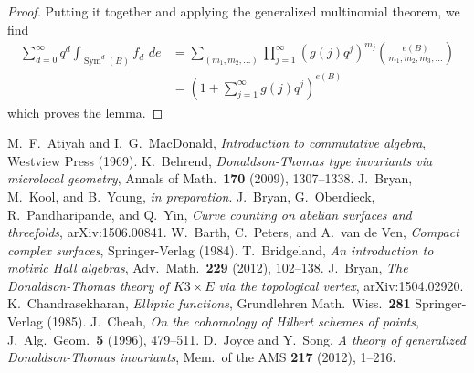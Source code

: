 \documentclass{amsart}
\theoremstyle{definition}
\newcommand{\Sym}{\operatorname{Sym}}
\begin{document}
\begin{proof}
Putting it together and applying the generalized multinomial theorem,
we find
\begin{align*}
\sum _{d=0}^{\infty } q^d \int _{\Sym ^{d} (B)}f_{d}\,\,de & = \sum _{(m_{1},m_{2},\dots )} \prod _{j=1}^{\infty } \left(g (j) q^{j} \right)^{m_{j}} \binom{e (B)}{m_{1},m_{2},m_{3},\dots }\\
&=\left(1+\sum _{j=1}^{\infty }g (j) q^{j} \right)^{e (B)}
\end{align*}
which proves the lemma.   
\end{proof}

     
\begin{thebibliography}{MNOP2}
 M.~F.~Atiyah and I.~G.~MacDonald, \textit{Introduction to commutative algebra}, Westview Press (1969).
 K.~Behrend, \textit{Donaldson-Thomas type invariants via microlocal geometry}, Annals of Math.~\textbf{170} (2009), 1307--1338.
 J.~Bryan, M.~Kool, and B.~Young, \emph{in preparation}.
 J.~Bryan, G.~Oberdieck, R.~Pandharipande, and Q.~Yin, \emph{Curve counting on abelian surfaces and threefolds}, arXiv:1506.00841.
 W.~Barth, C.~Peters, and A.~van de Ven, \textit{Compact complex surfaces}, Springer-Verlag (1984).
 T.~Bridgeland, \textit{An introduction to motivic Hall algebras}, Adv.~Math.~\textbf{229} (2012), 102--138.
 J.~Bryan, \textit{The Donaldson-Thomas theory of $K3 \times E$ via the topological vertex}, arXiv:1504.02920.
 K.~Chandrasekharan, \emph{Elliptic functions}, Grundlehren Math.~Wiss.~\textbf{281} Springer-Verlag (1985).
 J.~Cheah, \textit{On the cohomology of Hilbert schemes of points}, J.~Alg.~Geom.~\textbf{5} (1996), 479--511.
 D.~Joyce and Y.~Song, \textit{A theory of generalized Donaldson-Thomas invariants}, Mem.~of the AMS \textbf{217} (2012), 1--216.

\end{thebibliography}
\end{document}
